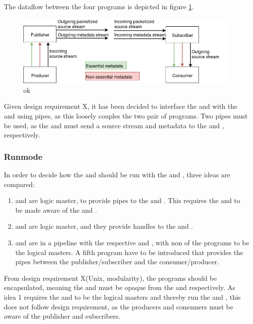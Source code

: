 The dataflow between the four programs is depicted in figure \ref{fig:design:pubsub}.
\begin{figure}[H]
	\centering
	\includegraphics[width=1\textwidth]{figures/publisher-subscriber}
	\caption{ok} \label{fig:design:pubsub}
\end{figure}


Given design requirement X, it has been decided to interface the \pubs and \subs with the \pros{} and \cons{} using pipes, as this loosely couples the two pair of programs. Two pipes must be used, as the \pros{} and \subs{} must send a source stream and metadata to the \pubs{} and \cons, respectively.

\subsubsection*{Runmode}
In order to decide how the \pubs{} and \subs{} should be run with the \pros{} and \cons{}, three ideas are compared:
\begin{enumerate}
	\item \cons{} and \pros{} are logic master, to provide pipes to the \pubs{} and \subs{}. This requires the \cons{} and \pros{} to be made aware of the \subs{} and \pubs{}. 
	\item \subs{} and \pubs{} are logic master, and they provide handles to the \cons{} and \subs{}.
	\item \subs{} and \pubs{} are in a pipeline with the respective \cons{} and \pros{}, with non of the programs to be the logical masters. A fifth program have to be introduced that provides the pipes between the publisher/subscriber and the consumer/producer.
\end{enumerate}

From design requirement X(Unix, modularity), the programs should be encapsulated, meaning the \pubs{} and \subs{} must be opaque from the \cons{} and \pros{} respectively. As idea 1 requires the \cons{} and \pros{} to be the logical masters and thereby run the \pubs{} and \subs{}, this does not follow design requirement, as the producers and consumers must be aware of the publisher and subscribers.

